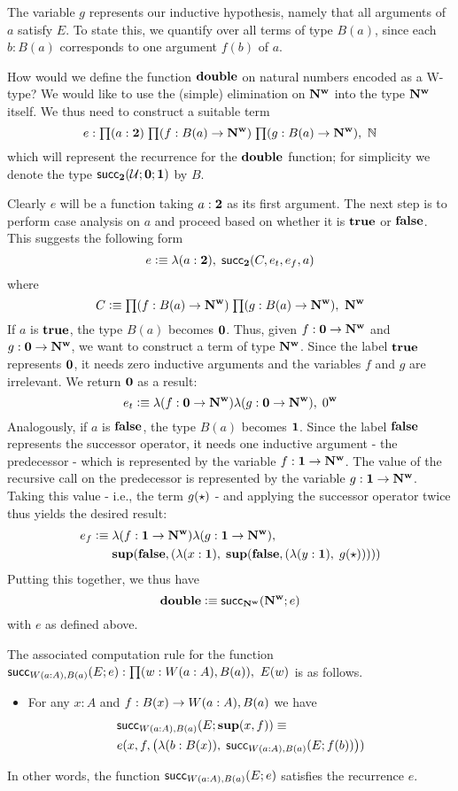 The variable $g$ represents our inductive hypothesis, namely that all arguments of $a$ satisfy $E$. To state this, we quantify over all terms of type $B(a)$, since each $b : B(a)$ corresponds to one argument $f(b)$ of $a$.

How would we define the function $\mathbf{double}$ on natural numbers encoded as a W-type? We would like to use the (simple) elimination on $\mathbf{N^w}$ into the type $\mathbf{N^w}$ itself. We thus need to construct a suitable term 
\[e : \prd{a : \two}{f : B(a) \to \natw}{g : B(a) \to \natw} \nat\]
which will represent the recurrence for the $\mathbf{double}$ function; for simplicity we denote the type $\mathsf{succ}_\mathbf{2}(\mathcal{U};\mathbf{0};\mathbf{1})$ by $B$.

Clearly $e$ will be a function taking $a : \mathbf{2}$ as its first argument. The next step is to perform case analysis on $a$ and proceed based on whether it is $\mathbf{true}$ or $\mathbf{false}$. This suggests the following form
\[ e \vcentcolon\equiv \lambda(a : \mathbf{2}), \; \mathsf{succ}_\mathbf{2}(C,e_t,e_f,a) \]
where \[C \defeq \prd{f : B(a) \to \natw}{g : B(a) \to \natw} \natw\]
If $a$ is $\mathbf{true}$, the type $B(a)$ becomes $\mathbf{0}$. Thus, given $f : \mathbf{0} \to \mathbf{N^w}$ and $g : \mathbf{0} \to \mathbf{N^w}$, we want to construct a term of type $\mathbf{N^w}$. Since the label $\mathbf{true}$ represents $\mathbf{0}$, it needs zero inductive arguments and the variables $f$ and $g$ are irrelevant. We return $\mathbf{0}$ as a result:
\[ e_t \vcentcolon\equiv \lambda(f:\mathbf{0} \to \mathbf{N^w})\lambda(g:\mathbf{0} \to \mathbf{N^w}), \; 0^\mathbf{w} \]
Analogously, if $a$ is $\mathbf{false}$, the type $B(a)$ becomes $\mathbf{1}$. Since the label $\mathbf{false}$ represents the successor operator, it needs one inductive argument - the predecessor - which is represented by the variable $f : \mathbf{1} \to \mathbf{N^w}$. The value of the recursive call on the predecessor is represented by the variable $g : \mathbf{1} \to \mathbf{N^w}$. Taking this value - i.e., the term $g(\star)$ - and applying the successor operator twice thus yields the desired result:
\begin{align*}
 e_f \vcentcolon\equiv & \; \lambda(f:\mathbf{1} \to \mathbf{N^w})\lambda(g:\mathbf{1} \to \mathbf{N^w}), \\
  & \; \mathbf{sup}(\mathbf{false}, (\lambda (x:\mathbf{1}), \; \mathbf{sup}(\mathbf{false}, (\lambda (y : \mathbf{1}), \; g(\star)))))
\end{align*}
Putting this together, we thus have
\[ \mathbf{double} \vcentcolon\equiv \mathsf{succ}_\mathbf{N^w}(\mathbf{N^w}; e) \]
with $e$ as defined above.

The associated computation rule for the function $\rec_{\wtype{a:A} B(a)}(E;e) : \prd{w : \wtype{a:A} B(a)} E(w)$ is as follows.
\begin{itemize}
\item For any $x : A$ and $f : B(x) \to W(a:A), B(a)$ we have 
\begin{align*}
& \mathsf{succ}_{W(a:A), B(a)}(E;\mathbf{sup}(x,f)) \equiv \\ & e(x,f,\big(\lambda (b : B(x)), \; \mathsf{succ}_{W(a:A), B(a)}(E;f(b))\big))
\end{align*}
\end{itemize}
In other words, the function $\mathsf{succ}_{W(a:A), B(a)}(E;e)$ satisfies the recurrence $e$.


